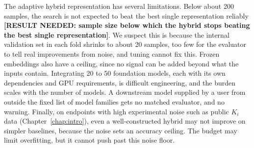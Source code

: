 The adaptive hybrid representation has several limitations. Below about 200 samples, the search is not expected to beat the best single representation reliably \textbf{[RESULT NEEDED: sample size below which the hybrid stops beating the best single representation]}. We suspect this is because the internal validation set in each fold shrinks to about 20 samples, too few for the evaluator to tell real improvements from noise, and tuning cannot fix this. Frozen embeddings also have a ceiling, since no signal can be added beyond what the inputs contain. Integrating 20 to 50 foundation models, each with its own dependencies and GPU requirements, is difficult engineering, and the burden scales with the number of models. A downstream model supplied by a user from outside the fixed list of model families gets no matched evaluator, and no warning. Finally, on endpoints with high experimental noise such as public $K_i$ data (Chapter~\ref{chap:intro}), even a well-constructed hybrid may not improve on simpler baselines, because the noise sets an accuracy ceiling. The budget may limit overfitting, but it cannot push past this noise floor.


